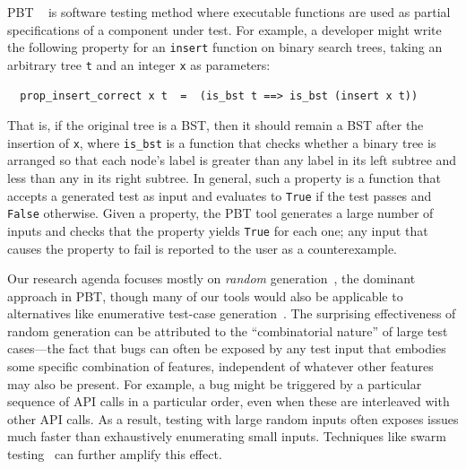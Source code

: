 %
PBT%
~\cite{hughes2007quickcheck}
is software testing method where
executable functions are used as partial
specifications of a component under test. For example, a developer might
write the following property for an \lstinline{insert}
function on binary search trees, taking an arbitrary tree \texttt{t}
and an integer
\texttt{x} as parameters:
\begin{lstlisting}
  prop_insert_correct x t  =  (is_bst t ==> is_bst (insert x t))
\end{lstlisting}
That is, if the original tree
is a BST, then it should remain
a BST after the insertion of \texttt{x},
where \lstinline{is_bst} is a function that checks whether a binary
tree is arranged so that each node's label is greater
than any label in its left subtree and less than any in its right
subtree.
In general, such a property is a function that
accepts a generated
test as input \iflater{}\fi
and evaluates to \lstinline{True} if the test passes and
\lstinline{False} otherwise.
Given a property, the PBT tool generates a
large number of inputs and
checks that the property yields \lstinline{True} for each one; any input
that causes the property to fail is reported to the user as a
{counterexample}.

Our research agenda focuses mostly on {\em random}
generation~\cite{hamlet1994random}, the dominant approach in PBT,
though many of our tools would also be applicable to alternatives
like enumerative test-case
generation~\cite{DBLP:conf/haskell/RuncimanNL08, leancheck}.  The
surprising effectiveness of random generation can be attributed to the
``combinatorial nature'' of large test cases---the fact that bugs can
often be exposed by any test input that embodies some specific combination
of features, independent of whatever other features may also be
present.  For example, a bug might be triggered by a particular
sequence of API calls in a particular order, even when
these are interleaved with other API calls. As a result, testing with
large random inputs often exposes issues much faster than exhaustively
enumerating small inputs.  Techniques like swarm
testing~\cite{groce2012swarm} can further amplify this effect.

